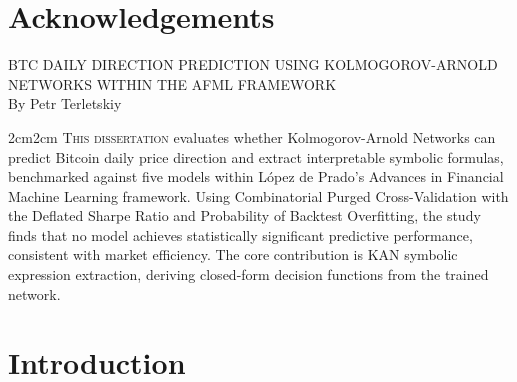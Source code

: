 \documentclass[12pt,a4paper,oneside]{article}
\begin{document}
\newpage
\thispagestyle{plain}
\section*{Acknowledgements}



\newpage
\thispagestyle{plain}

\setcounter{page}{1}

\begin{center}
\textsc{BTC DAILY DIRECTION PREDICTION USING KOLMOGOROV-ARNOLD NETWORKS WITHIN THE AFML FRAMEWORK}\\

\vspace{0.5cm}
By Petr Terletskiy\\

\begingroup\singlespacing
\begin{changemargin}{2cm}{2cm}
{\footnotesize \textsc{This dissertation} evaluates whether Kolmogorov-Arnold Networks can predict Bitcoin daily price direction and extract interpretable symbolic formulas, benchmarked against five models within López de Prado's Advances in Financial Machine Learning framework. Using Combinatorial Purged Cross-Validation with the Deflated Sharpe Ratio and Probability of Backtest Overfitting, the study finds that no model achieves statistically significant predictive performance, consistent with market efficiency. The core contribution is KAN symbolic expression extraction, deriving closed-form decision functions from the trained network.}
\end{changemargin}
\endgroup
\end{center}


\section{Introduction}\label{sec:introduction}
\end{document}

